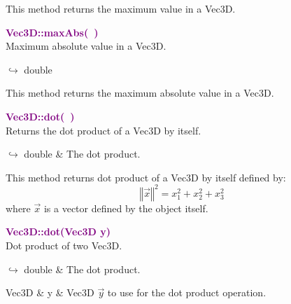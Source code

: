This method returns the maximum value in a Vec3D.

\textcolor{purple}{\textbf{Vec3D::maxAbs(~)}}\label{Vec3D::maxAbs()}\\
Maximum absolute value in a Vec3D.\vspace*{-0.5em}
\begin{tcolorbox}[grow to left by=-1cm, width=\textwidth-1cm,myArgs,tabularx={l|R}]
$\hookrightarrow$ double
\end{tcolorbox}

This method returns the maximum absolute value in a Vec3D.

\textcolor{purple}{\textbf{Vec3D::dot(~)}}\label{Vec3D::dot()}\\
Returns the dot product of a Vec3D by itself.\vspace*{-0.5em}
\begin{tcolorbox}[grow to left by=-1cm, width=\textwidth-1cm,myArgs,tabularx={l|R}]
$\hookrightarrow$ double & The dot product.
\end{tcolorbox}

This method returns dot product of a Vec3D by itself defined by:
\begin{equation*}
\left\Vert \overrightarrow{x} \right\Vert^2  = x_{1}^2 + x_{2}^2 + x_{3}^2
\end{equation*}
where $\overrightarrow{x}$ is a vector defined by the object itself.

\textcolor{purple}{\textbf{Vec3D::dot(Vec3D y)}}\label{Vec3D::dot(Vec3D y)}\\
Dot product of two Vec3D.\vspace*{-0.5em}
\begin{tcolorbox}[grow to left by=-1cm, width=\textwidth-1cm,myArgs,tabularx={l|R}]
$\hookrightarrow$ double & The dot product.
\end{tcolorbox}

\begin{tcolorbox}[width=\textwidth,myArgs,tabularx={ll|R}]
Vec3D & y & Vec3D $\overrightarrow{y}$ to use for the dot product operation.
\end{tcolorbox}

